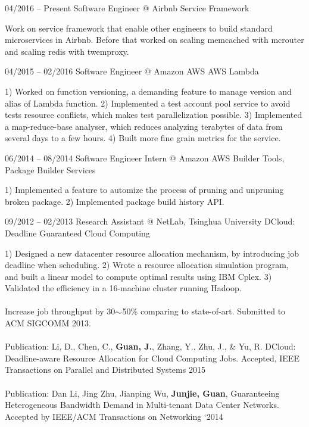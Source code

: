 \documentclass{tccv}
\begin{document}
\begin{eventlist}

\item{04/2016 -- Present}
     {Software Engineer @ Airbnb}
     {Service Framework}
     
     Work on service framework that enable other engineers to build standard microservices in Airbnb. Before that worked on scaling memcached with mcrouter and scaling redis with twemproxy.
     

\item{04/2015 -- 02/2016}
     {Software Engineer @ Amazon AWS}
     {AWS Lambda}
     
     1) Worked on function versioning, a demanding feature to manage version and alias of Lambda function.  2) Implemented a test account pool service to avoid tests resource conflicts, which makes test parallelization possible. 3) Implemented a map-reduce-base analyser, which reduces analyzing terabytes of data from several days to a few hours. 4) Built more fine grain metrics for the service.

\item{06/2014 -- 08/2014}
     {Software Engineer Intern @ Amazon AWS}
     {Builder Tools, Package Builder Services}
     
    1) Implemented a feature to automize the process of pruning and unpruning broken package. 2) Implemented package build history API.
     
     
     
     
 \item{09/2012 -- 02/2013}
 {Research Assistant @ NetLab, Tsinghua University}
 {DCloud: Deadline Guaranteed Cloud Computing}
 
 1) Designed a new datacenter resource allocation mechanism, by introducing job deadline when scheduling. 2) Wrote a resource allocation simulation program, and built a linear model to compute optimal results using IBM Cplex. 3) Validated the efficiency in a 16-machine cluster running Hadoop.
 \\\\
 Increase job throughput by 30$\scriptsize{\sim}$50\% comparing to state-of-art. Submitted to ACM SIGCOMM 2013.
 \\\\
 Publication: Li, D., Chen, C., \textbf{Guan, J.}, Zhang, Y., Zhu, J., \& Yu, R. DCloud: Deadline-aware Resource Allocation for Cloud Computing Jobs. Accepted, IEEE Transactions on Parallel and Distributed Systems 2015
 \\\\
 Publication: Dan Li, Jing Zhu, Jianping Wu, \textbf{Junjie, Guan}, Guaranteeing Heterogeneous Bandwidth Demand in Multi-tenant Data Center Networks. Accepted by IEEE/ACM Transactions on Networking ‘2014




\end{eventlist}
\end{document}
